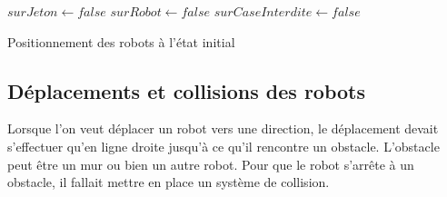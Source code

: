 \documentclass[a4paper, 12pt]{article}
\begin{document}
    
        \begin{algorithm}[H]%
            \DontPrintSemicolon
            $surJeton \gets false$
            $surRobot \gets false$
            $surCaseInterdite \gets false$
            
            \caption{\sc Positionnement des robots à l'état initial}
        \end{algorithm}%
        
    \subsection{Déplacements et collisions des robots}
    
        Lorsque l'on veut déplacer un robot vers une direction, le déplacement devait s'effectuer qu'en ligne droite jusqu'à ce qu'il rencontre un obstacle. L'obstacle peut être un mur ou bien un autre robot. Pour que le robot s'arrête à un obstacle, il fallait mettre en place un système de collision. 
        
\end{document}
